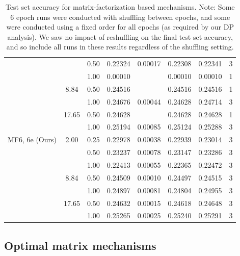 \documentclass{article} %
\theoremstyle{named}
\begin{document}
\begin{table}[H]
\begin{centering}
\begin{footnotesize}
\begin{tabular}{lS[table-format=2.2]lrrrrr}
               &       & 0.50 &           0.22324 & 0.00017 & 0.22308 & 0.22341 &     3 \\
               &       & 1.00 &           0.00010 &         & 0.00010 & 0.00010 &     1 \\
               & 8.84  & 0.50 &           0.24516 &         & 0.24516 & 0.24516 &     1 \\
               &       & 1.00 &           0.24676 & 0.00044 & 0.24628 & 0.24714 &     3 \\
               & 17.65 & 0.50 &           0.24628 &         & 0.24628 & 0.24628 &     1 \\
               &       & 1.00 &           0.25194 & 0.00085 & 0.25124 & 0.25288 &     3 \\
MF6, 6e (Ours) & 2.00  & 0.25 &           0.22978 & 0.00038 & 0.22939 & 0.23014 &     3 \\
               &       & 0.50 &           0.23237 & 0.00078 & 0.23147 & 0.23286 &     3 \\
               &       & 1.00 &           0.22413 & 0.00055 & 0.22365 & 0.22472 &     3 \\
               & 8.84  & 0.50 &           0.24509 & 0.00010 & 0.24497 & 0.24515 &     3 \\
               &       & 1.00 &           0.24897 & 0.00081 & 0.24804 & 0.24955 &     3 \\
               & 17.65 & 0.50 &           0.24632 & 0.00015 & 0.24618 & 0.24648 &     3 \\
               &       & 1.00 &           0.25265 & 0.00025 & 0.25240 & 0.25291 &     3 \\

\bottomrule
\end{tabular}
\end{footnotesize}
\caption{Test set accuracy for matrix-factorization based mechanisms. Note: Some 6 epoch runs were conducted with shuffling between epochs, and some were conducted using a fixed order for all epochs (as required by our DP analysis). We saw no impact of reshuffling on the final test set accuracy, and so include all runs in these results regardless of the shuffling setting.}
\label{tab:mf}
\end{centering}
\end{table}

\subsection{Optimal matrix mechanisms}
\end{document}
